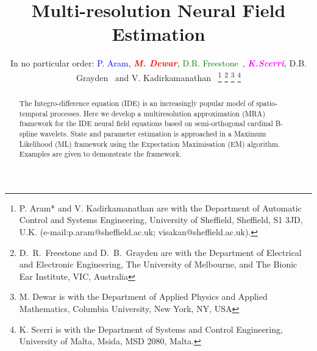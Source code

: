 \documentclass[journal,a4paper]{IEEEtran}
\newcommand{\mike}[1]{\textsf{\emph{\textbf{\textcolor{red}{#1}}}}}
\newcommand{\dean}[1]{\textcolor{green}{#1}}
\newcommand{\parham}[1]{\textcolor{blue}{#1}}
\newcommand{\ken}[1]{\textsf{\emph{\textbf{\textcolor{magenta}{#1}}}}}
\begin{document}
%
\title{Multi-resolution Neural Field Estimation }


\author{In no particular order: \parham{P. Aram}, \mike{M. Dewar}, \dean{D.R. Freestone~\IEEEmembership{Graduate Student Member,~IEEE,}}, \ken{K.Scerri}, D.B. Grayden~ and V. Kadirkamanathan~ %
\thanks{P. Aram* and V. Kadirkamanathan are with the Department of Automatic Control and Systems Engineering, University of Sheffield, Sheffield, S1 3JD, U.K. (e-mail:p.aram@sheffield.ac.uk; visakan@sheffield.ac.uk).}%
\thanks{D.\ R.\ Freestone and D.\ B.\ Grayden are with the Department
of Electrical and Electronic Engineering, The University of Melbourne, and The Bionic Ear Institute, VIC, Australia}
\thanks{M. Dewar is with the Department of Applied Physics and Applied Mathematics, Columbia University, New York, NY, USA}
\thanks{K. Scerri is with the Department of Systems and Control Engineering, University
of Malta, Msida, MSD 2080, Malta.}}



% 
 \ifCLASSOPTIONpeerreview
\else
\fi


\maketitle


\begin{abstract}
The Integro-difference equation (IDE) is an increasingly popular model of spatio-temporal processes. Here we develop a multiresolution approximation (MRA) framework for the IDE neural field equations based on semi-orthogonal cardinal B-spline wavelets. State and parameter estimation is approached in a Maximum Likelihood (ML) framework using the Expectation Maximisation (EM) algorithm. Examples are given to demonstrate the framework.
\end{abstract}
\end{document}

